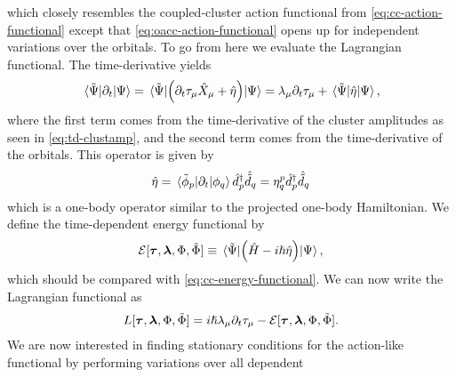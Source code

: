         which closely resembles the coupled-cluster action functional from
        \autoref{eq:cc-action-functional} except that
        \autoref{eq:oacc-action-functional} opens up for independent
        variations over the orbitals.
        To go from here we evaluate the Lagrangian functional.
        The time-derivative yields
        \begin{align}
            \mel*{\tilde{\Psi}}{\partial_t}{\Psi}
            =
            \mel*{\tilde{\Psi}}{
                \left( 
                    \partial_t \tau_{\mu}\hat{X}_{\mu}
                    +
                    \hat{\eta}
                 \right)
            }{\Psi}
            =
            \lambda_{\mu}\partial_t\tau_{\mu}
            + \mel*{\tilde{\Psi}}{\hat{\eta}}{\Psi},
        \end{align}
        where the first term comes from the time-derivative of the cluster
        amplitudes as seen in \autoref{eq:td-clustamp}, and the second term
        comes from the time-derivative of the orbitals.
        This operator is given by
        \begin{align}
            \hat{\eta}
            = \mel*{\tilde{\phi}_p}{\partial_t}{\phi_q}
            \hat{d}^{\dagger}_{p}\hat{\tilde{d}}_{q}
            = \eta^{p}_{q}\hat{d}^{\dagger}_{p}\hat{\tilde{d}}_{q}
        \end{align}
        which is a one-body operator similar to the projected one-body
        Hamiltonian.
        We define the time-dependent energy functional by
        \begin{align}
            \mathcal{E}[
                \boldsymbol{\tau}, \boldsymbol{\lambda}, \Phi, \tilde{\Phi}
            ]
            \equiv \mel*{\tilde{\Psi}}{
                \left( 
                    \hat{H} - i\hslash\hat{\eta}
                 \right)
            }{\Psi},
        \end{align}
        which should be compared with \autoref{eq:cc-energy-functional}.
        We can now write the Lagrangian functional as
        \begin{align}
            L[\boldsymbol{\tau}, \boldsymbol{\lambda}, \Phi, \tilde{\Phi}]
            =
            i\hslash\lambda_{\mu}\partial_t\tau_{\mu}
            -
            \mathcal{E}[
                \boldsymbol{\tau}, \boldsymbol{\lambda}, \Phi, \tilde{\Phi}
            ].
            \label{eq:oatdcc-lagrangian}
        \end{align}
        We are now interested in finding stationary conditions for the
        action-like functional by performing variations over all dependent
